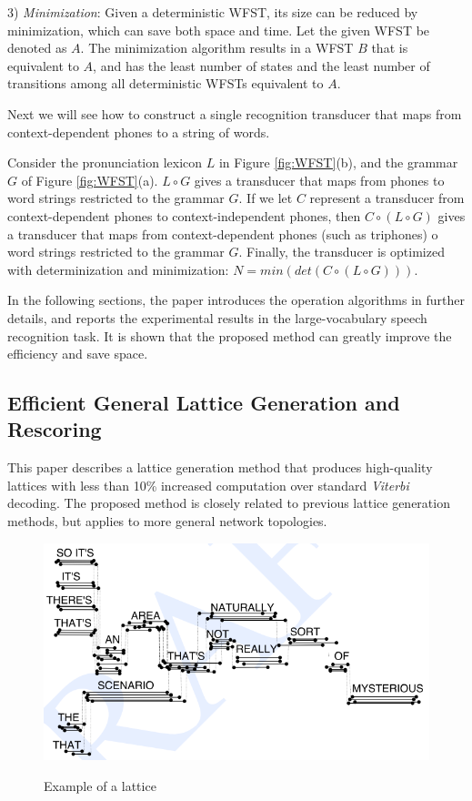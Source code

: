 \documentclass[paper=a4, fontsize=18pt]{article} %
\numberwithin{equation}{section} %
\numberwithin{figure}{section} %
\numberwithin{table}{section} %
\begin{document}
3) \emph{Minimization}: Given a deterministic WFST, its size can be reduced by minimization, which can save both space and time. Let the given WFST be denoted as $A$. The minimization algorithm results in a WFST $B$ that is equivalent to $A$, and has the least number of states and the least number of transitions among all deterministic WFSTs equivalent to $A$.

Next we will see how to construct a single recognition transducer that maps from context-dependent phones to a string of words.

Consider the pronunciation lexicon $L$ in Figure \ref{fig:WFST}(b), and the grammar $G$ of Figure \ref{fig:WFST}(a). $L \circ G$ gives a transducer that maps from phones to word strings restricted to the grammar $G$. If we let $C$ represent a transducer from context-dependent phones to context-independent phones, then $C \circ (L \circ G)$ gives a transducer that maps from context-dependent phones (such as triphones) o word strings restricted to the grammar $G$. Finally, the transducer is optimized with determinization and minimization: $N = min(det(C \circ (L \circ G)))$.

In the following sections, the paper introduces the operation algorithms in further details, and reports the experimental results in the large-vocabulary speech recognition task. It is shown that the proposed method can greatly improve the efficiency and save space.

\subsection{Efficient General Lattice Generation and Rescoring \cite{Ljolje1999}}

This paper describes a lattice generation method that produces high-quality lattices with less than 10\% increased computation over standard \emph{Viterbi} decoding. The proposed method is closely related to previous lattice generation methods, but applies to more general network topologies.

\begin{figure}[h]
  \centering
  \includegraphics[width=.7\linewidth]{11_21_lattice.png}\\
  \caption{Example of a lattice}\label{fig:lattice}
\end{figure}
\end{document}
